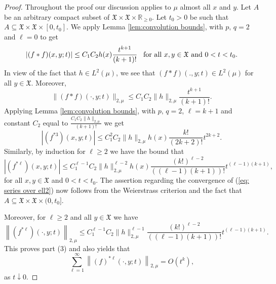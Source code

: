 \documentclass[11pt,reqno]{amsart}
\theoremstyle{remark}
\theoremstyle{definition}
\numberwithin{theorem}{section} \numberwithin{equation}{section}
\newcommand{\X}{\mathfrak{X}}
\begin{document}
\begin{proof} Throughout the proof our discussion applies to $\mu$ almost all $x$ and $y$.
Let $A$ be an arbitrary compact subset of $\X\times \X\times\mathbb{R}_{\geq0}$.
Let $t_0>0$ be such that $A\subseteq \X\times \X\times [0,t_0]$.
We apply Lemma \ref{lem:convolution bounds}, with $p,\, q=2$ and $\ell=0$ to get
\begin{equation*}
\left|(f\ast f)(x,y;t)\right| \leq C_1C_2 h(x) \frac{t^{k+1}}{(k+1)!} \,\,\,\,\,
\text{\rm for all $x,y\in \X$ and $0<t<t_{0}$.}
\end{equation*}
In view of the fact that $h\in L^2(\mu)$, we see that $(f\ast f)(.,y;t)\in L^2(\mu)$ for all $y\in\X$. Moreover,
$$
\|(f\ast f)(\cdot,y;t)\|_{2,\mu}\leq C_1C_2 \|h\|_{2,\mu}  \frac{t^{k+1}}{(k+1)!}.
$$
Applying Lemma \ref{lem:convolution bounds}, with $p,\, q=2$, $\ell=k+1$ and constant $C_2$ equal to $   \frac{C_1C_2 \|h\|_{2,\mu}}{(k+1)!}$ we get
$$
\left|(f^{\ast 3})(x,y;t)\right|\leq C_1^2C_2\|h\|_{2,\mu} h(x)\frac{k!}{(2k+2)!}t^{2k+2}.
$$
Similarly, by induction for $\ell\geq 2$ we have the bound that
\begin{equation}
  \label{eq:mult_convolution_bound2}
\left|(f^{\ast\ell})(x,y;t)\right|
\leq
C_1^{\ell-1}C_2\|h\|_{2,\mu}^{\ell-2} h(x)\frac{(k!)^{\ell-2}}{((\ell-1)(k+1))!}t^{(\ell-1)(k+1)},
\end{equation}
for all $x,y\in \X$ and $0<t<t_{0}$.
The assertion regarding the convergence of (\ref{eq: series over ell2}) now follows
from the Weierstrass criterion and the fact that $A\subseteq \X\times \X\times (0,t_0]$.

Moreover, for $\ell\geq 2$ and all $y\in\X$ we have
\begin{equation}\label{eq. ell conv norm 2 bound}
\left\|(f^{\ast\ell})(\cdot,y;t)\right\|_{2,\mu}
\leq
C_1^{\ell-1}C_2\|h\|_{2,\mu}^{\ell-1} \frac{(k!)^{\ell-2}}{((\ell-1)(k+1))!}t^{(\ell-1)(k+1)}.
\end{equation}
This proves part (3) and also yields that
$$
\sum_{\ell=1}^{\infty}\left\|(f)^{\ast\ell}(\cdot,y;t)\right\|_{2,\mu}=O(t^k),
$$
as $t\downarrow 0$.


\end{proof}
\end{document}
